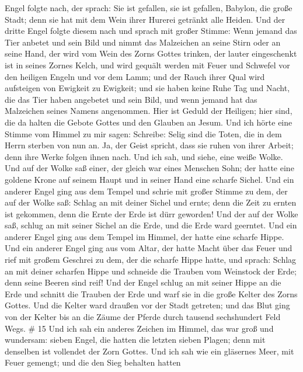 Engel folgte nach, der sprach: Sie ist gefallen, sie ist gefallen,
Babylon, die große Stadt; denn sie hat mit dem Wein ihrer Hurerei
getränkt alle Heiden.  Und der dritte Engel folgte diesem
nach und sprach mit großer Stimme: Wenn jemand das Tier anbetet und sein
Bild und nimmt das Malzeichen an seine Stirn oder an seine Hand,
 der wird vom Wein des Zorns Gottes trinken, der lauter
eingeschenkt ist in seines Zornes Kelch, und wird gequält werden mit
Feuer und Schwefel vor den heiligen Engeln und vor dem Lamm;
 und der Rauch ihrer Qual wird aufsteigen von Ewigkeit zu
Ewigkeit; und sie haben keine Ruhe Tag und Nacht, die das Tier haben
angebetet und sein Bild, und wenn jemand hat das Malzeichen seines
Namens angenommen.  Hier ist Geduld der Heiligen; hier
sind, die da halten die Gebote Gottes und den Glauben an Jesum.
 Und ich hörte eine Stimme vom Himmel zu mir sagen:
Schreibe: Selig sind die Toten, die in dem Herrn sterben von nun an. Ja,
der Geist spricht, dass sie ruhen von ihrer Arbeit; denn ihre Werke
folgen ihnen nach.  Und ich sah, und siehe, eine weiße
Wolke. Und auf der Wolke saß einer, der gleich war eines Menschen Sohn;
der hatte eine goldene Krone auf seinem Haupt und in seiner Hand eine
scharfe Sichel.  Und ein anderer Engel ging aus dem Tempel
und schrie mit großer Stimme zu dem, der auf der Wolke saß: Schlag an
mit deiner Sichel und ernte; denn die Zeit zu ernten ist gekommen, denn
die Ernte der Erde ist dürr geworden!  Und der auf der
Wolke saß, schlug an mit seiner Sichel an die Erde, und die Erde ward
geerntet.  Und ein anderer Engel ging aus dem Tempel im
Himmel, der hatte eine scharfe Hippe.  Und ein anderer
Engel ging aus vom Altar, der hatte Macht über das Feuer und rief mit
großem Geschrei zu dem, der die scharfe Hippe hatte, und sprach: Schlag
an mit deiner scharfen Hippe und schneide die Trauben vom Weinstock der
Erde; denn seine Beeren sind reif!  Und der Engel schlug an
mit seiner Hippe an die Erde und schnitt die Trauben der Erde und warf
sie in die große Kelter des Zorns Gottes.  Und die Kelter
ward draußen vor der Stadt getreten; und das Blut ging von der Kelter
bis an die Zäume der Pferde durch tausend sechshundert Feld Wegs. \# 15
 Und ich sah ein anderes Zeichen im Himmel, das war groß und
wundersam: sieben Engel, die hatten die letzten sieben Plagen; denn mit
denselben ist vollendet der Zorn Gottes.  Und ich sah wie
ein gläsernes Meer, mit Feuer gemengt; und die den Sieg behalten hatten
